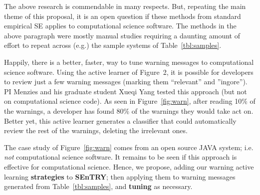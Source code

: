 \documentclass{NSF}
\newcommand{\tbl}[1]{Table~\ref{tbl:#1}}
\newcommand{\fig}[1]{Figure~\ref{fig:#1}}
\newcommand{\IT}{{\bf {\sffamily SEnTRY}}}
\begin{document}
\begin{nsfdescription}
 The above research is commendable in many respects. But, repeating the main theme of this proposal, it is an open question if these methods
from standard empirical SE applies to computational science software.  The methods in the above paragraph were mostly manual studies requiring
a daunting amount of effort to repeat across (e.g.) the sample systems of \tbl{samples}.





 Happily, there is a better, faster, way to tune warning messages
to computational science software. Using the active learner of Figure~2, it is possible for developers  to review just a few  warning messages (marking them ``relevant'' and ''ingore'').
PI Menzies and his graduate student
Xueqi Yang tested this approach (but not on computational
science code). As seen in \fig{warn}, after reading
 10\% of the warnings, a developer has found 80\% of the warnings they would take act on. Better yet, 
this active learner generates
a classifier that could  automatically review the rest
of the warnings, deleting the irrelevant ones.


The case study of \fig{warn} comes from an open source JAVA system;
i.e. {\em not} computational science software. It remains to be seen if this approach is effective for computational science. 
Hence, we propose,
adding   our warning active learning {\bf strategies}
to {\IT}; then
applying them  to warning messages  generated  from \tbl{samples}, and 
{\bf tuning}  as necessary.



\end{nsfdescription}
\end{document}
